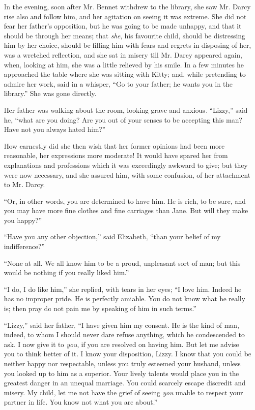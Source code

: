 \documentclass[12pt]{book}
\begin{document}
In the evening, soon after Mr. Bennet withdrew to the library, she saw Mr. Darcy rise also and follow him, and her agitation on seeing it was extreme. She did not fear her father's opposition, but he was going to be made unhappy, and that it should be through her means; that \textit{she}, his favourite child, should be distressing him by her choice, should be filling him with fears and regrets in disposing of her, was a wretched reflection, and she sat in misery till Mr. Darcy appeared again, when, looking at him, she was a little relieved by his smile. In a few minutes he approached the table where she was sitting with Kitty; and, while pretending to admire her work, said in a whisper, ``Go to your father; he wants you in the library.'' She was gone directly.

Her father was walking about the room, looking grave and anxious. ``Lizzy,'' said he, ``what are you doing? Are you out of your senses to be accepting this man? Have not you always hated him?''

How earnestly did she then wish that her former opinions had been more reasonable, her expressions more moderate! It would have spared her from explanations and professions which it was exceedingly awkward to give; but they were now necessary, and she assured him, with some confusion, of her attachment to Mr. Darcy.

``Or, in other words, you are determined to have him. He is rich, to be sure, and you may have more fine clothes and fine carriages than Jane. But will they make you happy?''

``Have you any other objection,'' said Elizabeth, ``than your belief of my indifference?''

``None at all. We all know him to be a proud, unpleasant sort of man; but this would be nothing if you really liked him.''

``I do, I do like him,'' she replied, with tears in her eyes; ``I love him. Indeed he has no improper pride. He is perfectly amiable. You do not know what he really is; then pray do not pain me by speaking of him in such terms.''

``Lizzy,'' said her father, ``I have given him my consent. He is the kind of man, indeed, to whom I should never dare refuse anything, which he condescended to ask. I now give it to \textit{you}, if you are resolved on having him. But let me advise you to think better of it. I know your disposition, Lizzy. I know that you could be neither happy nor respectable, unless you truly esteemed your husband, unless you looked up to him as a superior. Your lively talents would place you in the greatest danger in an unequal marriage. You could scarcely escape discredit and misery. My child, let me not have the grief of seeing \textit{you} unable to respect your partner in life. You know not what you are about.''
\end{document}
